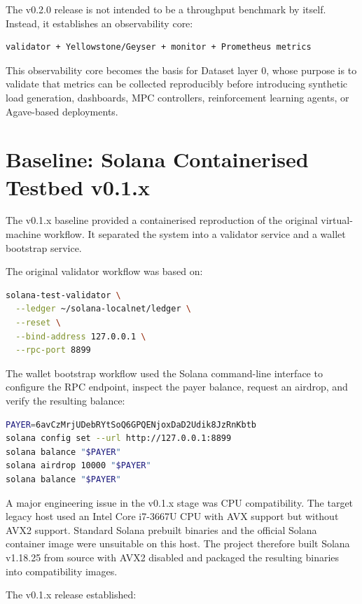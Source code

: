\documentclass[11pt,a4paper]{article}
\begin{document}
The v0.2.0 release is not intended to be a throughput benchmark by itself. Instead, it establishes an observability core:

\begin{lstlisting}
validator + Yellowstone/Geyser + monitor + Prometheus metrics
\end{lstlisting}

This observability core becomes the basis for Dataset layer 0, whose purpose is to validate that metrics can be collected reproducibly before introducing synthetic load generation, dashboards, MPC controllers, reinforcement learning agents, or Agave-based deployments.

\section{Baseline: Solana Containerised Testbed v0.1.x}

The v0.1.x baseline provided a containerised reproduction of the original virtual-machine workflow. It separated the system into a validator service and a wallet bootstrap service.

The original validator workflow was based on:

\begin{lstlisting}[language=bash]
solana-test-validator \
  --ledger ~/solana-localnet/ledger \
  --reset \
  --bind-address 127.0.0.1 \
  --rpc-port 8899
\end{lstlisting}

The wallet bootstrap workflow used the Solana command-line interface to configure the RPC endpoint, inspect the payer balance, request an airdrop, and verify the resulting balance:

\begin{lstlisting}[language=bash]
PAYER=6avCzMrjUDebRYtSoQ6GPQENjoxDaD2Udik8JzRnKbtb
solana config set --url http://127.0.0.1:8899
solana balance "$PAYER"
solana airdrop 10000 "$PAYER"
solana balance "$PAYER"
\end{lstlisting}

A major engineering issue in the v0.1.x stage was CPU compatibility. The target legacy host used an Intel Core i7-3667U CPU with AVX support but without AVX2 support. Standard Solana prebuilt binaries and the official Solana container image were unsuitable on this host. The project therefore built Solana v1.18.25 from source with AVX2 disabled and packaged the resulting binaries into compatibility images.

The v0.1.x release established:
\end{document}

